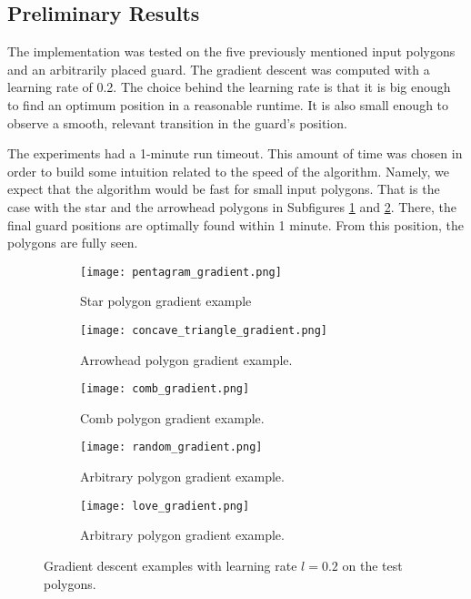 \subsection{Preliminary Results}
The implementation was tested on the five previously mentioned input polygons and an arbitrarily placed guard. The gradient descent was computed with a learning rate of 0.2. The choice behind the learning rate is that it is big enough to find an optimum position in a reasonable runtime. It is also small enough to observe a smooth, relevant transition in the guard's position.

The experiments had a 1-minute run timeout. This amount of time was chosen in order to build some intuition related to the speed of the algorithm. Namely, we expect that the algorithm would be fast for small input polygons. That is the case with the star and the arrowhead polygons in Subfigures \ref{fig:star_gradient} and \ref{fig:concave_gradient}. There, the final guard positions are optimally found within 1 minute. From this position, the polygons are fully seen.


\begin{figure}[h!]
    \centering
    \begin{subfigure}{0.45\textwidth}
        \centering
        \texttt{[image: pentagram\_gradient.png]}
        \caption{Star polygon gradient example}
        \label{fig:star_gradient}
    \end{subfigure}
    \begin{subfigure}{0.45\textwidth}
        \centering
        \texttt{[image: concave\_triangle\_gradient.png]}
        \caption{Arrowhead polygon gradient example.}
        \label{fig:concave_gradient}
    \end{subfigure}
    \begin{subfigure}{0.45\textwidth}
        \centering
        \texttt{[image: comb\_gradient.png]}
        \caption{Comb polygon gradient example.}
        \label{fig:comb_gradient}
    \end{subfigure}
    \begin{subfigure}{0.45\textwidth}
        \centering
        \texttt{[image: random\_gradient.png]}
        \caption{Arbitrary polygon gradient example.}
        \label{fig:random_gradient}
    \end{subfigure}
    \begin{subfigure}{\textwidth}
        \centering
        \texttt{[image: love\_gradient.png]}
        \caption{Arbitrary polygon gradient example.}
        \label{fig:love_gradient}
    \end{subfigure}
    \caption{Gradient descent examples with learning rate $l = 0.2$ on the test polygons.}
    \label{fig:gradients}
\end{figure}

